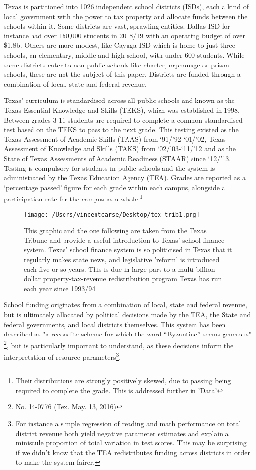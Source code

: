 \documentclass[11pt]{article}
\begin{document}
Texas is partitioned into 1026 independent school districts (ISDs), each a kind of local government with the power to tax property and allocate funds between the schools within it. Some districts are vast, sprawling entities. Dallas ISD for instance had over 150,000 students in 2018/19 with an operating budget of over \$1.8b. Others are more modest, like Cayuga ISD which is home to just three schools, an elementary, middle and high school, with under 600 students. While some districts cater to non-public schools like charter, orphanage or prison schools, these are not the subject of this paper. Districts are funded through a combination of local, state and federal revenue. 

Texas’ curriculum is standardised across all public schools and known as the Texas Essential Knowledge and Skills (TEKS), which was established in 1998. Between grades 3-11 students are required to complete a common standardised test based on the TEKS to pass to the next grade. This testing existed as the Texas Assessment of Academic Skills (TAAS) from ‘91/’92-‘01/’02, Texas Assessment of Knowledge and Skills (TAKS) from ‘02/’03-‘11/’12 and as the State of Texas Assessments of Academic Readiness (STAAR) since ‘12/’13. Testing is compulsory for students in public schools and the system is administrated by the Texas Education Agency (TEA). Grades are reported as a ‘percentage passed’ figure for each grade within each campus, alongside a participation rate for the campus as a whole.\footnote{Their distributions are strongly positively skewed, due to passing being required to complete the grade. This is addressed further in 'Data'} 

\begin{figure}
    \label{image-myimage}
    \texttt{[image: /Users/vincentcarse/Desktop/tex\_trib1.png]}
    \caption{This graphic and the one following are taken from the Texas Tribune and provide a useful introduction to Texas' school finance system. Texas' school finance system is so politicised in Texas that it regularly makes state news, and legislative 'reform' is introduced each five or so years. This is due in large part to a multi-billion dollar property-tax-revenue redistribution program Texas has run each year since 1993/94.}
\end{figure}

School funding originates from a combination of local, state and federal revenue, but is ultimately allocated by political decisions made by the TEA, the State and federal governments, and local districts themselves. This system has been described as "a recondite scheme for which the word “Byzantine” seems generous" \footnote{No. 14-0776 (Tex. May. 13, 2016)}, but is particularly important to understand, as these decisions inform the interpretation of resource parameters\footnote{For instance a simple regression of reading and math performance on total district revenue both yield negative parameter estimates and explain a miniscule proportion of total variation in test scores. This may be surprising if we didn’t know that the TEA redistributes funding across districts in order to make the system fairer.}. 
\end{document}
